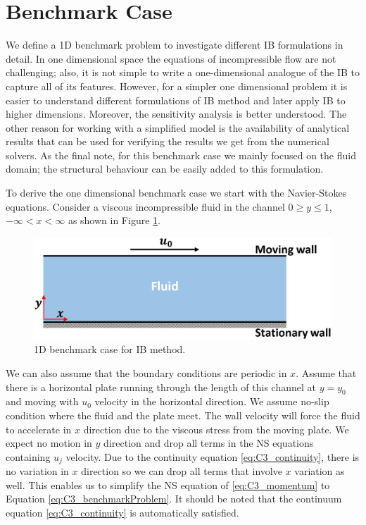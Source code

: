 \section{Benchmark Case}\label{sec:C3_benchmark_case}
We define a 1D benchmark problem to investigate different IB formulations in detail. In one dimensional space the equations of incompressible flow are not challenging; also, it is not simple to write a one-dimensional analogue of the IB to capture all of its features. However, for a simpler one dimensional problem it is easier to understand different formulations of IB method and later apply IB to higher dimensions. Moreover, the sensitivity analysis is better understood. The other reason for working with a simplified model is the availability of analytical results that can be used for verifying the results we get from the numerical solvers. As the final note, for this benchmark case we mainly focused on the fluid domain; the structural behaviour can be easily added to this formulation.

To derive the one dimensional benchmark case we start with the Navier-Stokes equations. Consider a viscous incompressible fluid in the channel $0 \geq y \leq 1$, $-\infty < x < \infty$ as shown in Figure \ref{fig:C3_benchmarkCase}.

\begin{figure}[H]
    \centering
    \includegraphics[width=14.00cm]{Chapter_3/figure/C3_infinite_channel.png}
    \caption{1D benchmark case for IB method.}
    \label{fig:C3_benchmarkCase}
\end{figure}

We can also assume that the boundary conditions are periodic in $x$. Assume that there is a horizontal plate running through the length of this channel at $y=y_0$ and moving with $u_0$ velocity in the horizontal direction. We assume no-slip condition where the fluid and the plate meet. The wall velocity will force the fluid to accelerate in $x$ direction due to the viscous stress from the moving plate. We expect no motion in $y$ direction and drop all terms in the NS equations containing $u_j$ velocity. Due to the continuity equation \eqref{eq:C3_continuity}, there is no variation in $x$ direction so we can drop all terms that involve $x$ variation as well. This enables us to simplify the NS equation of \eqref{eq:C3_momentum} to Equation \eqref{eq:C3_benchmarkProblem}. It should be noted that the continuum equation \eqref{eq:C3_continuity} is automatically satisfied.

